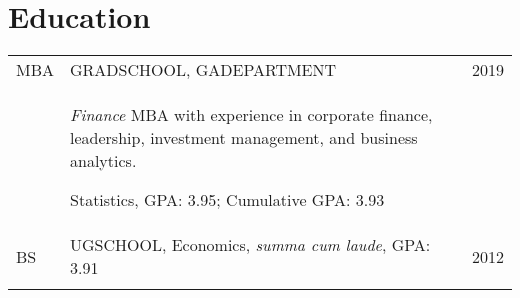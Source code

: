 \documentclass[a4paper,10pt]{article}
\begin{document}
\smallskip
\section{Education}
\begin{supertabular}{p{1.5cm}p{13.9cm}>{\raggedleft\arraybackslash}p{1.5cm}}
	\textsc{MBA} & \textsc{GRADSCHOOL}, \small GADEPARTMENT
	& 	\textsc{2019} \\
	& \begin{enumerate*}[label =$\circ$, itemjoin={\newline}]
	\item \footnotesize \emph{Finance} MBA with experience in corporate finance, leadership, investment management, and business analytics.
	\item \small Statistics, GPA: 3.95; Cumulative GPA: 3.93
	\end{enumerate*}
	& \\
	\textsc{BS} & \textsc{UGSCHOOL}, \small Economics, \emph{summa cum laude}, GPA: 3.91
	&	\textsc{2012} 	\\
	 \\
\end{supertabular}



\smallskip
\end{document}
